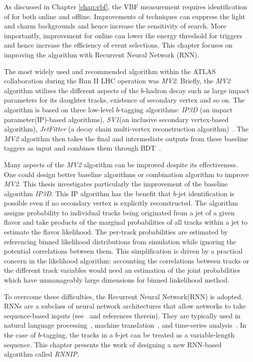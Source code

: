 As discussed in Chapter \ref{chap:vbf}, the VBF \Hbb measurement requires identification of \bjets for both online and offline. Improvements of \btagging techniques can suppress the light and charm backgrounds and hence increase the sensitivity of \Hbb search. More importantly, improvement for online \btagging can lower the energy threshold for \bjet triggers and hence increase the efficiency of \Hbb event selections. This chapter focuses on improving the \btagging algorithm with Recurrent Neural Network (RNN). 

The most widely used and recommended \btagging algorithm within the ATLAS collaboration during the Run II LHC operation was \textit{MV2}. Briefly, the \textit{MV2} algorithm utilizes the different aspects of the $b$-hadron decay such as large impact parameters for its daughter tracks, existence of secondary vertex and so on. The algorithm is based on three low-level $b$-tagging algorithms: \textit{IP3D} (an impact parameter(IP)-based algorithms), \textit{SV1}(an inclusive secondary vertex-based algorithm), \textit{JetFitter} (a decay chain multi-vertex reconstruction algorithm)~\cite{ref:btagPaper}. The \textit{MV2} algorithm then takes the final and intermediate outputs from these baseline taggers as input and combines them through BDT~\cite{ATL-PHYS-PUB-2016-012}.

Many aspects of the \textit{MV2} algorithm can be improved despite its effectiveness. One could design better baseline algorithms or combination algorithm to improve \textit{MV2}. This thesis investigates particularly the improvement of the baseline algorithm \textit{IP3D}. This IP algorithm has the benefit that $b$-jet identification is possible even if no secondary vertex is explicitly reconstructed. The algorithm assigns probability to individual tracks being originated from a jet of a given flavor and take products of the marginal probabilities of all tracks within a jet to estimate the flavor likelihood. The per-track probabilities are estimated by referencing binned likelihood distributions from simulation while ignoring the potential correlations between them. This simplification is driven by a practical concern in the likelihood algorithm: accounting the correlations between tracks or the different track variables would need an estimation of the joint probabilities which have unmanageably large dimensions for binned linkelihood method.

To overcome these difficulties, the Recurrent Neural Network(RNN) is adopted. RNNs are a subclass of neural network architectures that allow networks to take sequence-based inputs (see~\cite{ref:RNNthesis} and references therein). They are typically used in natural language processing~\cite{languagemodel,DBLP:journals/corr/abs-1303-5778}, machine translation~\cite{MT,MT2}, and time-series analysis~\cite{timeseries,timeseries2}. In the case of $b$-tagging, the tracks in a $b$-jet can be treated as a variable-length sequence. This chapter presents the work of designing a new RNN-based \btagging algorithm called \textit{RNNIP}.
